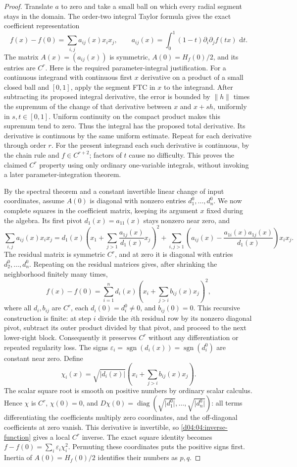 \documentclass[11pt,oneside,openany]{book}
\theoremstyle{definition}
\theoremstyle{remark}
\newcommand{\eps}{\varepsilon}
\newcommand{\abs}[1]{\lvert#1\rvert}
\newcommand{\norm}[1]{\lVert#1\rVert}
\newcommand{\dd}{\,\mathrm d}
\DeclareMathOperator{\diag}{diag}
\DeclareMathOperator{\sgn}{sgn}
\begin{document}
\begin{proof}
Translate $a$ to zero and take a small ball on which every radial segment
stays in the domain. The order-two integral Taylor formula gives the exact
coefficient representation
\[
 f(x)-f(0)=\sum_{i,j}a_{ij}(x)x_ix_j,\qquad
 a_{ij}(x)=\int_0^1(1-t)\partial_i\partial_j f(tx)\,\dd t.
\]
The matrix $A(x)=(a_{ij}(x))$ is symmetric, $A(0)=H_f(0)/2$, and its
entries are $C^r$. Here is the required parameter-integral justification.
For a continuous integrand with continuous first $x$ derivative on a product
of a small closed ball and $[0,1]$, apply the segment FTC in $x$ to the
integrand. After subtracting its proposed integral derivative, the error is
bounded by $\norm{h}$ times the supremum of the change of that derivative
between $x$ and $x+sh$, uniformly in $s,t\in[0,1]$. Uniform continuity on
the compact product makes this supremum tend to zero. Thus the integral
has the proposed total derivative. Its derivative is continuous by the
same uniform estimate. Repeat for each derivative through order $r$.
For the present integrand each such derivative is continuous, by the chain
rule and $f\in C^{r+2}$; factors of $t$ cause no difficulty. This proves
the claimed $C^r$ property using only ordinary one-variable integrals,
without invoking a later parameter-integration theorem.

By the spectral theorem and a constant invertible linear change of input
coordinates, assume $A(0)$ is diagonal with nonzero entries $d_1^0,\ldots,d_n^0$.
We now complete squares in the coefficient matrix, keeping its argument $x$
fixed during the algebra. Its first pivot $d_1(x)=a_{11}(x)$ stays nonzero
near zero, and
\[
 \sum_{i,j}a_{ij}(x)x_ix_j
 =d_1(x)\left(x_1+\sum_{j>1}\frac{a_{1j}(x)}{d_1(x)}x_j\right)^2
  +\sum_{i,j>1}\left(a_{ij}(x)
                -\frac{a_{1i}(x)a_{1j}(x)}{d_1(x)}\right)x_ix_j.
\]
The residual matrix is symmetric $C^r$, and at zero it is diagonal with
entries $d_2^0,\ldots,d_n^0$. Repeating on the residual matrices gives,
after shrinking the neighborhood finitely many times,
\[
 f(x)-f(0)=\sum_{i=1}^n d_i(x)
             \left(x_i+\sum_{j>i}b_{ij}(x)x_j\right)^2,
\]
where all $d_i,b_{ij}$ are $C^r$, each $d_i(0)=d_i^0\ne0$, and
$b_{ij}(0)=0$. This recursive construction is finite: at step $i$ divide
the $i$th residual row by its nonzero diagonal pivot, subtract its outer
product divided by that pivot, and proceed to the next lower-right block.
Consequently it preserves $C^r$ without any differentiation or repeated
regularity loss. The signs $\eps_i=\sgn(d_i(x))=\sgn(d_i^0)$ are constant
near zero. Define
\[
 \chi_i(x)=\sqrt{\abs{d_i(x)}}
                  \left(x_i+\sum_{j>i}b_{ij}(x)x_j\right).
\]
The scalar square root is smooth on positive numbers by ordinary scalar
calculus. Hence $\chi$ is $C^r$, $\chi(0)=0$, and
$D\chi(0)=\diag(\sqrt{\abs{d_1^0}},\ldots,\sqrt{\abs{d_n^0}})$:
all terms differentiating the coefficients multiply zero coordinates, and
the off-diagonal coefficients at zero vanish. This derivative is invertible,
so \cref{d04:04:inverse-function} gives a local $C^r$ inverse. The exact
square identity becomes $f-f(0)=\sum_i\eps_i\chi_i^2$. Permuting these
coordinates puts the positive signs first. Inertia of $A(0)=H_f(0)/2$
identifies their numbers as $p,q$.


\end{proof}
\end{document}
